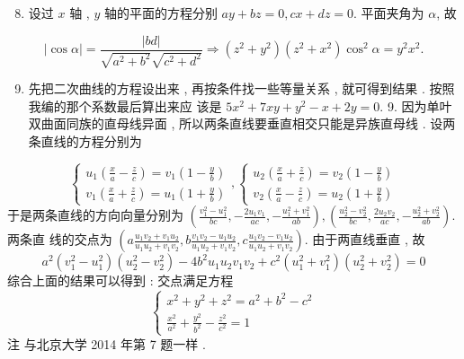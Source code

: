 \documentclass[10pt]{article}
\begin{document}
\begin{enumerate}
  \setcounter{enumi}{7}
  \item  设过  $x$  轴 , $y$  轴的平面的方程分别  $a y+b z=0, c x+d z=0$.  平面夹角为  $\alpha$,  故 
\end{enumerate}
$$
|\cos \alpha|=\frac{|b d|}{\sqrt{a^{2}+b^{2}} \sqrt{c^{2}+d^{2}}} \Longrightarrow\left(z^{2}+y^{2}\right)\left(z^{2}+x^{2}\right) \cos ^{2} \alpha=y^{2} x^{2} .
$$

\begin{enumerate}
  \setcounter{enumi}{8}
  \item  先把二次曲线的方程设出来 ,  再按条件找一些等量关系 ,  就可得到结果 .  按照我编的那个系数最后算出来应   该是  $5 x^{2}+7 x y+y^{2}-x+2 y=0$. 9.  因为单叶双曲面同族的直母线异面 ,  所以两条直线要垂直相交只能是异族直母线 .  设两条直线的方程分别为 
\end{enumerate}
$$
\left\{\begin{array}{l}
u_{1}\left(\frac{x}{a}-\frac{z}{c}\right)=v_{1}\left(1-\frac{y}{b}\right) \\
v_{1}\left(\frac{x}{a}+\frac{z}{c}\right)=u_{1}\left(1+\frac{y}{b}\right)
\end{array},\left\{\begin{array}{l}
u_{2}\left(\frac{x}{a}+\frac{z}{c}\right)=v_{2}\left(1-\frac{y}{b}\right) \\
v_{2}\left(\frac{x}{a}-\frac{z}{c}\right)=u_{2}\left(1+\frac{y}{b}\right)
\end{array}\right.\right.
$$
 于是两条直线的方向向量分别为  $\left(\frac{v_{1}^{2}-u_{1}^{2}}{b c},-\frac{2 u_{1} v_{1}}{a c},-\frac{u_{1}^{2}+v_{1}^{2}}{a b}\right),\left(\frac{u_{2}^{2}-v_{2}^{2}}{b c}, \frac{2 u_{2} v_{2}}{a c},-\frac{u_{2}^{2}+v_{2}^{2}}{a b}\right)$.  两条直   线的交点为  $\left(a \frac{u_{1} v_{2}+v_{1} u_{2}}{u_{1} u_{2}+v_{1} v_{2}}, b \frac{v_{1} v_{2}-u_{1} u_{2}}{u_{1} u_{2}+v_{1} v_{2}}, c \frac{u_{1} v_{2}-v_{1} u_{2}}{u_{1} u_{2}+v_{1} v_{2}}\right)$.  由于两直线垂直 ,  故 
$$
a^{2}\left(v_{1}^{2}-u_{1}^{2}\right)\left(u_{2}^{2}-v_{2}^{2}\right)-4 b^{2} u_{1} u_{2} v_{1} v_{2}+c^{2}\left(u_{1}^{2}+v_{1}^{2}\right)\left(u_{2}^{2}+v_{2}^{2}\right)=0
$$
 综合上面的结果可以得到 :  交点满足方程 
$$
\left\{\begin{array}{c}
x^{2}+y^{2}+z^{2}=a^{2}+b^{2}-c^{2} \\
\frac{x^{2}}{a^{2}}+\frac{y^{2}}{b^{2}}-\frac{z^{2}}{c^{2}}=1
\end{array}\right.
$$
 注   与北京大学  2014  年第  7  题一样 .
\end{document}
